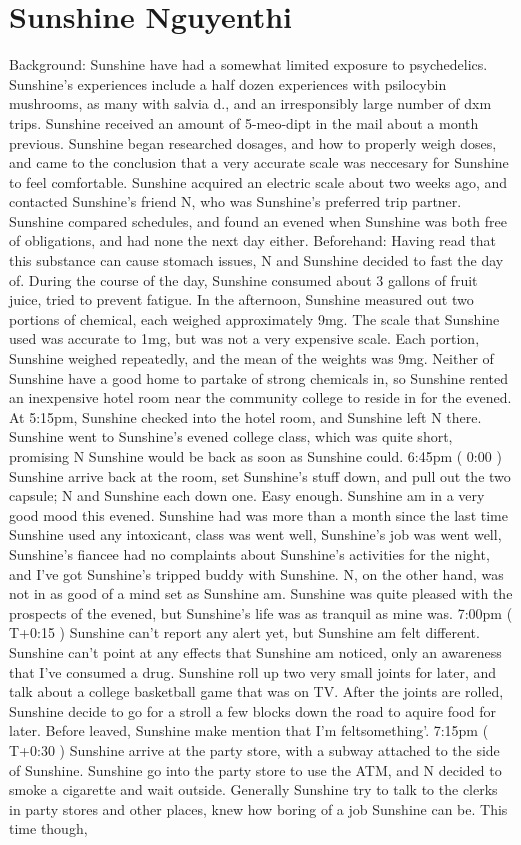 \documentclass[12pt]{book}
\begin{document}
\chapter{Sunshine Nguyenthi}

Background: Sunshine have had a somewhat limited exposure to psychedelics. Sunshine's experiences include a half dozen experiences with psilocybin mushrooms, as many with salvia d., and an irresponsibly large number of dxm trips. Sunshine received an amount of 5-meo-dipt in the mail about a month previous. Sunshine began researched dosages, and how to properly weigh doses, and came to the conclusion that a very accurate scale was neccesary for Sunshine to feel comfortable. Sunshine acquired an electric scale about two weeks ago, and contacted Sunshine's friend N, who was Sunshine's preferred trip partner. Sunshine compared schedules, and found an evened when Sunshine was both free of obligations, and had none the next day either. Beforehand: Having read that this substance can cause stomach issues, N and Sunshine decided to fast the day of. During the course of the day, Sunshine consumed about 3 gallons of fruit juice, tried to prevent fatigue. In the afternoon, Sunshine measured out two portions of chemical, each weighed approximately 9mg. The scale that Sunshine used was accurate to 1mg, but was not a very expensive scale. Each portion, Sunshine weighed repeatedly, and the mean of the weights was 9mg. Neither of Sunshine have a good home to partake of strong chemicals in, so Sunshine rented an inexpensive hotel room near the community college to reside in for the evened. At 5:15pm, Sunshine checked into the hotel room, and Sunshine left N there. Sunshine went to Sunshine's evened college class, which was quite short, promising N Sunshine would be back as soon as Sunshine could. 6:45pm ( 0:00 ) Sunshine arrive back at the room, set Sunshine's stuff down, and pull out the two capsule; N and Sunshine each down one. Easy enough. Sunshine am in a very good mood this evened. Sunshine had was more than a month since the last time Sunshine used any intoxicant, class was went well, Sunshine's job was went well, Sunshine's fiancee had no complaints about Sunshine's activities for the night, and I've got Sunshine's tripped buddy with Sunshine. N, on the other hand, was not in as good of a mind set as Sunshine am. Sunshine was quite pleased with the prospects of the evened, but Sunshine's life was as tranquil as mine was. 7:00pm ( T+0:15 ) Sunshine can't report any alert yet, but Sunshine am felt different. Sunshine can't point at any effects that Sunshine am noticed, only an awareness that I've consumed a drug. Sunshine roll up two very small joints for later, and talk about a college basketball game that was on TV. After the joints are rolled, Sunshine decide to go for a stroll a few blocks down the road to aquire food for later. Before leaved, Sunshine make mention that I'm feltsomething'. 7:15pm ( T+0:30 ) Sunshine arrive at the party store, with a subway attached to the side of Sunshine. Sunshine go into the party store to use the ATM, and N decided to smoke a cigarette and wait outside. Generally Sunshine try to talk to the clerks in party stores and other places, knew how boring of a job Sunshine can be. This time though, 
\end{document}
